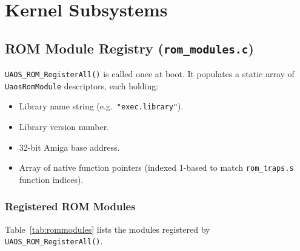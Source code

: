 \documentclass[11pt,a4paper]{report}
\begin{document}
\chapter{Kernel Subsystems}

\section{ROM Module Registry (\texttt{rom\_modules.c})}

\texttt{UAOS\_ROM\_RegisterAll()} is called once at boot.  It populates a
static array of \texttt{UaosRomModule} descriptors, each holding:
\begin{itemize}
    \item Library name string (e.g.\ \texttt{"exec.library"}).
    \item Library version number.
    \item 32-bit Amiga base address.
    \item Array of native function pointers (indexed 1-based to match
          \texttt{rom\_traps.s} function indices).
\end{itemize}

\subsection{Registered ROM Modules}

Table~\ref{tab:rommodules} lists the modules registered by
\texttt{UAOS\_ROM\_RegisterAll()}.
\end{document}

